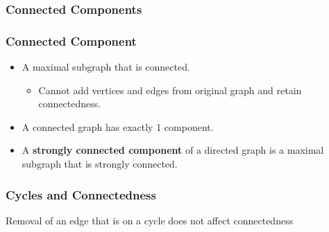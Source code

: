 \documentclass[newPxFont,sthlmFooter,nooffset]{beamer}
\begin{document}
\begin{frame}[t]
  \frametitle{Connected Components}

\begin{center}
\end{center}
\end{frame}


\begin{frame}[t]
  \frametitle{Connected Component}
  \begin{itemize}
  \item A maximal subgraph that is connected.
    \begin{itemize}
    \item Cannot add vertices and edges from original graph and retain
      connectedness.
    \end{itemize}
  \item A connected graph has exactly 1 component. 
  \end{itemize}
\bigskip
\begin{itemize}
\item A \textbf{strongly connected component} of a directed graph is a
  maximal subgraph that is strongly connected.
\end{itemize}
\end{frame}


\begin{frame}[t]
  \frametitle{Cycles and Connectedness}
Removal of an edge that is on a cycle does not affect connectedness
\begin{center}
\end{center}
\end{frame}
\end{document}
